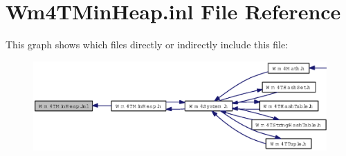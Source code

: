\section{Wm4TMin\-Heap.inl File Reference}
\label{Wm4TMinHeap_8inl}


This graph shows which files directly or indirectly include this file:\begin{figure}[H]
\begin{center}
\leavevmode
\includegraphics[width=363pt]{Wm4TMinHeap_8inl__dep__incl}
\end{center}
\end{figure}
